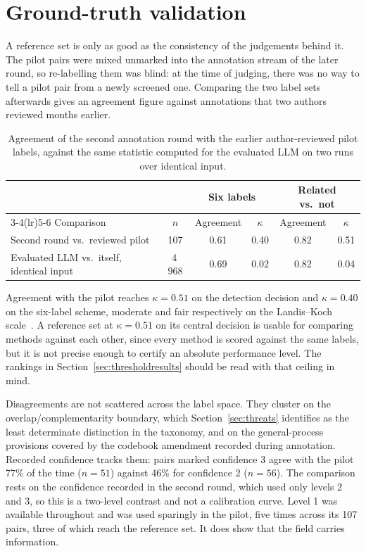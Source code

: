 \section{Ground-truth validation}\label{sec:agreementresults}

A reference set is only as good as the consistency of the judgements behind it.
The pilot pairs were mixed unmarked into the annotation stream of the later
round, so re-labelling them was blind: at the time of judging, there was no way
to tell a pilot pair from a newly screened one. Comparing the two label sets
afterwards gives an agreement figure against annotations that two authors
reviewed months earlier.

\begin{table}[htbp]
\centering
\caption[Reference-set agreement against the pilot and the LLM contrast]{%
Agreement of the second annotation round with the earlier author-reviewed
pilot labels, against the same statistic computed for the evaluated LLM on two
runs over identical input.}
\label{tab:agreement}
\small
\begin{tabular}{lccccc}
\toprule
 & & \multicolumn{2}{c}{Six labels} & \multicolumn{2}{c}{Related vs.\ not}\\
\cmidrule(lr){3-4}\cmidrule(lr){5-6}
Comparison & $n$ & Agreement & $\kappa$ & Agreement & $\kappa$\\
\midrule
Second round vs.\ reviewed pilot & 107 & 0.61 & 0.40 & 0.82 & 0.51\\
Evaluated LLM vs.\ itself, identical input & 4\,968 & 0.69 & 0.02 & 0.82 & 0.04\\
\bottomrule
\end{tabular}
\end{table}

Agreement with the pilot reaches $\kappa = 0.51$ on the detection decision and
$\kappa = 0.40$ on the six-label scheme, moderate and fair respectively on the
Landis--Koch scale~\cite{landis1977kappa}. A reference set at $\kappa = 0.51$ on
its central decision is usable for comparing methods against each other, since
every method is scored against the same labels, but it is not precise enough to
certify an absolute performance level. The rankings in
Section~\ref{sec:thresholdresults} should be read with that ceiling in mind.

Disagreements are not scattered across the label space. They cluster on the
overlap/complementarity boundary, which Section~\ref{sec:threats} identifies as
the least determinate distinction in the taxonomy, and on the general-process
provisions covered by the codebook amendment recorded during annotation. Recorded
confidence tracks them: pairs marked confidence 3 agree with the pilot 77\% of
the time ($n = 51$) against 46\% for confidence 2 ($n = 56$). The comparison rests
on the confidence recorded in the second round, which used only levels 2 and 3,
so this is a two-level contrast and not a calibration curve. Level 1 was
available throughout and was used sparingly in the pilot, five times across its
107 pairs, three of which reach the reference set. It does show that the field
carries information.


